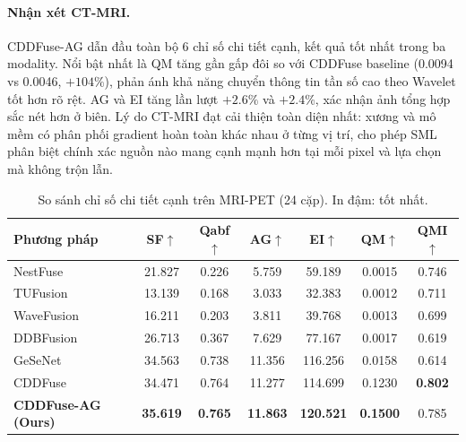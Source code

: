 \paragraph{Nhận xét CT-MRI.}
CDDFuse-AG dẫn đầu toàn bộ 6 chỉ số chi tiết cạnh, kết quả tốt nhất trong ba modality. Nổi bật nhất là QM tăng gần gấp đôi so với CDDFuse baseline (0.0094 vs 0.0046, $+104\%$), phản ánh khả năng chuyển thông tin tần số cao theo Wavelet tốt hơn rõ rệt. AG và EI tăng lần lượt $+2.6\%$ và $+2.4\%$, xác nhận ảnh tổng hợp sắc nét hơn ở biên. Lý do CT-MRI đạt cải thiện toàn diện nhất: xương và mô mềm có phân phối gradient hoàn toàn khác nhau ở từng vị trí, cho phép SML phân biệt chính xác nguồn nào mang cạnh mạnh hơn tại mỗi pixel và lựa chọn mà không trộn lẫn.

\begin{table}[H]
\centering\small
\caption[Chỉ số chi tiết cạnh trên MRI-PET (24 cặp)]{So sánh chỉ số chi tiết cạnh trên MRI-PET (24 cặp). In đậm: tốt nhất.}
\label{tab:best6-pet}
\setlength{\tabcolsep}{4.5pt}
\begin{tabular}{lcccccc}
\toprule
\textbf{Phương pháp} & \textbf{SF}$\uparrow$ & \textbf{Qabf}$\uparrow$ & \textbf{AG}$\uparrow$ & \textbf{EI}$\uparrow$ & \textbf{QM}$\uparrow$ & \textbf{QMI}$\uparrow$ \\
\midrule
  NestFuse~\cite{li2020nestfuse}   & 21.827 & 0.226 & 5.759 & 59.189 & 0.0015 & 0.746 \\
  TUFusion~\cite{zhao2024tufusion} & 13.139 & 0.168 & 3.033 & 32.383 & 0.0012 & 0.711 \\
  WaveFusion~\cite{wang2025wavefusion} & 16.211 & 0.203 & 3.811 & 39.768 & 0.0013 & 0.699 \\
  DDBFusion~\cite{zhang2025ddbfusion}  & 26.713 & 0.367 & 7.629 & 77.167 & 0.0017 & 0.619 \\
  GeSeNet~\cite{li2023gesenet}    & 34.563 & 0.738 & 11.356 & 116.256 & 0.0158 & 0.614 \\
  CDDFuse~\cite{zhao2023cddfuse}  & 34.471 & 0.764 & 11.277 & 114.699 & 0.1230 & \textbf{0.802} \\
  \midrule
  \textbf{CDDFuse-AG (Ours)} & \textbf{35.619} & \textbf{0.765} & \textbf{11.863} & \textbf{120.521} & \textbf{0.1500} & 0.785 \\
\bottomrule
\end{tabular}
\end{table}

